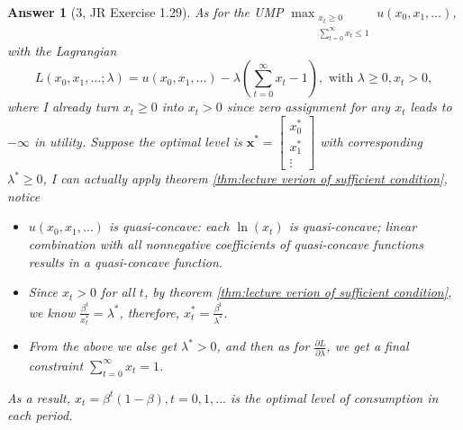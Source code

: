 \documentclass{article}
\newtheorem*{ans}{Answer}
\newcommand{\1}{{\bf 1}}
\newcommand{\0}{{\mathbf{0}}}
\newcommand{\x}{{\mathbf{x}}}
\newcommand{\<}{\langle}
\renewcommand{\>}{\rangle}
\newcommand{\dps}{\displaystyle}
\begin{document}
\begin{ans}[3, JR Exercise 1.29] As for the UMP  $\dps \max_{\substack{x_t \ge 0 \\\sum_{t = 0}^{\infty} x_t \le 1}}   u(x_0,x_1,\ldots)  $,
	with the  Lagrangian 
	$$\dps L(x_0,x_1,\ldots;\lambda) = u(x_0,x_1,\ldots)  - \lambda\left( \sum_{t= 0}^\infty  x_t  - 1 \right), \text{ with }\lambda \ge 0, x_t >  0,$$
	where I already turn $x_t \ge 0$ into $x_t >0$ since  zero assignment for any $x_t$ leads to $-\infty$ in utility.
	Suppose the optimal level is $\x^* =\begin{bmatrix}
	x_0^* \\ x_1^* \\ \vdots 
	\end{bmatrix}$ with corresponding $\lambda^* \ge 0$, I can actually apply theorem \ref{thm:lecture verion of sufficient condition}, notice
	\begin{itemize}
		\item $u(x_0,x_1,\ldots)$ is quasi-concave: each $\ln (x_t)$ is quasi-concave; linear combination with all nonnegative coefficients of quasi-concave functions results in a quasi-concave function.
		\item Since $x_t >0$ for all $t$, by theorem \ref{thm:lecture verion of sufficient condition}, we know $	 \frac{\beta^t}{x_t^* }= \lambda^* $, therefore, $x_t^* =  \frac{\beta^t}{\lambda^*} $.
		\item From the above we alse get $\lambda^* >0$, and then as for $\frac{\partial L}{\partial \lambda}$, we get a final constraint  $\sum_{t=0}^\infty x_t = 1$.
	\end{itemize}
	As a result, $x_t = \beta^t (1- \beta), t=0,1,\ldots$ is the optimal level of consumption in each period.
\end{ans}
\end{document}
